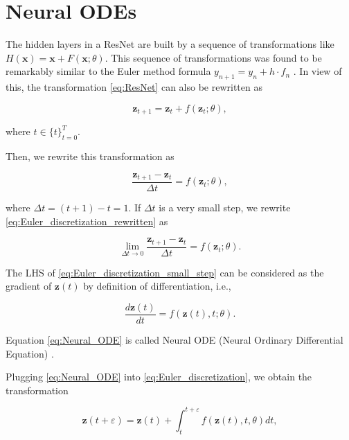 \documentclass[
	parskip, 			   %
	twoside, 			   %
	DIV=14, 			   %
	BCOR=15.0mm, 		   %
	headsepline, 		   %
	open=right, 		   %
	captions=tableheading, %
	bibliography=totoc,    %
	numbers=noenddot       %
]{scrreprt}
\begin{document}
\section{Neural ODEs}
The hidden layers in a ResNet are built by a sequence of transformations like $H(\mathbf{x})=\mathbf{x}+F(\mathbf{x};\theta)$. This sequence of transformations was found to be remarkably similar to the Euler method formula $y_{n+1} = y_{n} + h \cdot f_{n}$ \cite{ruthotto2020deep}. In view of this, the transformation \ref{eq:ResNet} can also be rewritten as

\begin{equation}
    \label{eq:Euler_discretization}
    \mathbf{z}_{t+1} = \mathbf{z}_{t} + f(\mathbf{z}_{t}; \theta),
\end{equation}

where $t \in \{t\}_{t=0}^T$.

Then, we rewrite this transformation as 

\begin{equation}
    \label{eq:Euler_discretization_rewritten}
    \frac{\mathbf{z}_{t+1}-\mathbf{z}_{t}}{\Delta t} = f(\mathbf{z}_{t}; \theta),
\end{equation}

where $\Delta t = (t+1)-t = 1$. If $\Delta t$ is a very small step, we rewrite \ref{eq:Euler_discretization_rewritten} as

\begin{equation}
    \label{eq:Euler_discretization_small_step}
    \lim_{\Delta t \to 0} \frac{\mathbf{z}_{t+1}-\mathbf{z}_{t}}{\Delta t} = f(\mathbf{z}_{t}; \theta).
\end{equation}

The LHS of \ref{eq:Euler_discretization_small_step} can be considered as the gradient of $\mathbf{z}(t)$ by definition of differentiation, i.e.,

\begin{equation}
    \label{eq:Neural_ODE}
    \frac{d\mathbf{z}(t)}{dt} = f(\mathbf{z}(t), t; \theta).
\end{equation}

Equation \ref{eq:Neural_ODE} is called Neural ODE (Neural Ordinary Differential Equation) \cite{chen2018neural}.

Plugging \ref{eq:Neural_ODE} into \ref{eq:Euler_discretization}, we obtain the transformation 

\begin{equation}
    \label{eq:Euler_transformation_NeuralODE}
    \mathbf{z}(t+\varepsilon ) = \mathbf{z}(t) + \int_{t}^{t+\varepsilon } f(\mathbf{z}(t), t, \theta)dt,
\end{equation}
\end{document}
